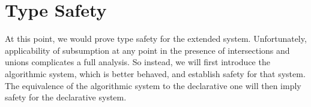 
\section{Type Safety}
\label{refinements:semantics}

At this point, we would prove type safety for the extended system. Unfortunately, applicability of subsumption at any point in the presence of intersections and unions complicates a full analysis. So instead, we will first introduce the algorithmic system, which is better behaved, and establish safety for that system. The equivalence of the algorithmic system to the declarative one will then imply safety for the declarative system.

